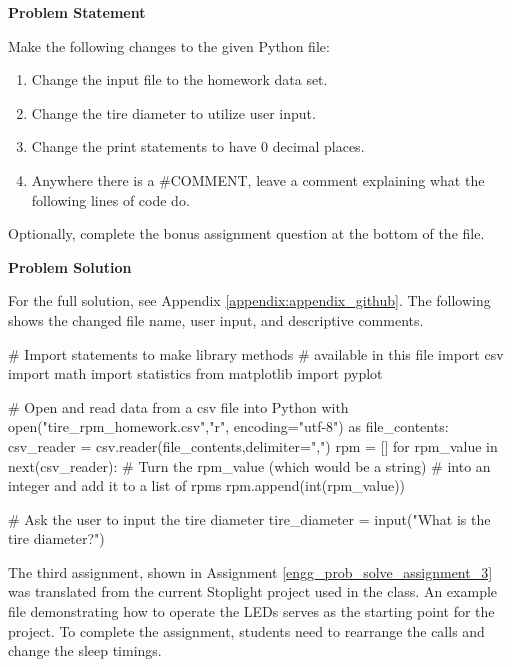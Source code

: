 \label{engg_prob_solve_assignment_2}

\begin{tcolorbox}[breakable, enhanced jigsaw, title=DEN 161: Assignment \ref{engg_prob_solve_assignment_2}, 
    colframe=ksu-purple, colback=ksu-gray]

    \textbf{Problem Statement}

    Make the following changes to the given Python file:

    \begin{enumerate}
        \item Change the input file to the homework data set.
        \item Change the tire diameter to utilize user input.
        \item Change the print statements to have 0 decimal places.
        \item Anywhere there is a \#COMMENT, leave a comment explaining what the following lines of code do.
    \end{enumerate}
               
    Optionally, complete the bonus assignment question at the bottom of the file.
    

    \tcblower
    \textbf{Problem Solution}

    For the full solution, see Appendix \ref{appendix:appendix_github}. The following shows the changed file
    name, user input, and descriptive comments.

\begin{python}
# Import statements to make library methods 
# available in this file
import csv
import math
import statistics
from matplotlib import pyplot

# Open and read data from a csv file into Python
with open("tire_rpm_homework.csv","r", 
          encoding="utf-8") as file_contents:
    csv_reader = csv.reader(file_contents,delimiter=",")
    rpm = []
    for rpm_value in next(csv_reader):
        # Turn the rpm_value (which would be a string) 
        # into an integer and add it to a list of rpms
        rpm.append(int(rpm_value))

# Ask the user to input the tire diameter
tire_diameter = input("What is the tire diameter?")
\end{python}
\end{tcolorbox}

The third assignment, shown in Assignment \ref{engg_prob_solve_assignment_3} was translated from the 
current Stoplight project used in the class. An example file
demonstrating how to operate the LEDs serves as the starting point for the project. To complete the
assignment, students need to rearrange the  calls and change the sleep timings.

